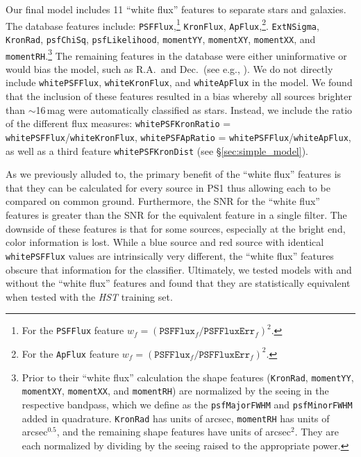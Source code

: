 \documentclass[twocolumn]{aastex62}
\begin{document}
Our final model includes 11 ``white flux'' features to separate stars and
galaxies. The database features include: \texttt{PSFFlux},\footnote{For the
\texttt{PSFFlux} feature $w_f =
(\mathtt{PSFFlux}_f/\mathtt{PSFFluxErr}_f)^2$.} \texttt{KronFlux},
\texttt{ApFlux},\footnote{For the \texttt{ApFlux} feature $w_f =
(\mathtt{PSFFlux}_f/\mathtt{PSFFluxErr}_f)^2$.}. 
\texttt{ExtNSigma},
\texttt{KronRad}, \texttt{psfChiSq}, \texttt{psfLikelihood},
\texttt{momentYY}, \texttt{momentXY}, \texttt{momentXX}, and
\texttt{momentRH}.\footnote{Prior to their ``white flux'' calculation the
shape features (\texttt{KronRad}, \texttt{momentYY}, \texttt{momentXY},
\texttt{momentXX}, and \texttt{momentRH}) are normalized by the seeing in the
respective bandpass, which we define as the \texttt{psfMajorFWHM} and
\texttt{psfMinorFWHM} added in quadrature. \texttt{KronRad} has units of
arcsec, \texttt{momentRH} has units of arcsec$^{0.5}$, and the remaining
shape features have units of arcsec$^{2}$. They are each normalized by
dividing by the seeing raised to the appropriate power. } The remaining
features in the database were either uninformative or would bias the model,
such as R.A.\ and Dec.\ (see e.g., \citealt{Richards12a}). We do not directly
include \texttt{whitePSFFlux}, \texttt{whiteKronFlux}, and
\texttt{whiteApFlux} in the model. We found that the inclusion of these
features resulted in a bias whereby all sources brighter than $\sim$16\,mag
were automatically classified as stars. Instead, we include the ratio of the
different flux measures: \texttt{whitePSFKronRatio} =
\texttt{whitePSFFlux}/\texttt{whiteKronFlux}, \texttt{whitePSFApRatio} =
\texttt{whitePSFFlux}/\texttt{whiteApFlux}, as well as a third feature
\texttt{whitePSFKronDist} (see \S\ref{sec:simple_model}).

As we previously alluded to, the primary benefit of the ``white flux''
features is that they can be calculated for every source in PS1 thus allowing
each to be compared on common ground. Furthermore, the SNR for the ``white
flux'' features is greater than the SNR for the equivalent feature in a
single filter. The downside of these features is that for some sources,
especially at the bright end, color information is lost. While a blue source
and red source with identical \texttt{whitePSFFlux} values are intrinsically
very different, the ``white flux'' features obscure that information for the
classifier. Ultimately, we tested models with and without the ``white flux''
features and found that they are statistically equivalent when tested with
the \textit{HST} training set.
\end{document}
